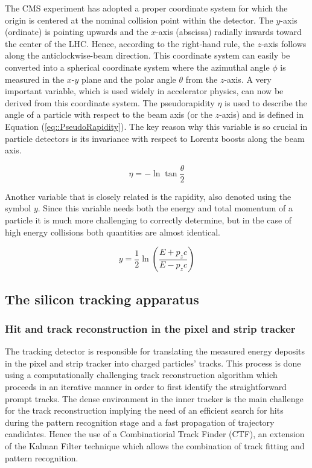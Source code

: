 The CMS experiment has adopted a proper coordinate system for which the origin is centered at the nominal collision point within the detector. The $y$-axis (ordinate) is pointing upwards and the $x$-axis (abscissa) radially inwards toward the center of the LHC. Hence, according to the right-hand rule, the $z$-axis follows along the anticlockwise-beam direction. This coordinate system can easily be converted into a spherical coordinate system where the azimuthal angle $\phi$ is measured in the $x$-$y$ plane and the polar angle $\theta$ from the $z$-axis. 
A very important variable, which is used widely in accelerator physics, can now be derived from this coordinate system. The pseudorapidity $\eta$ is used to describe the angle of a particle with respect to the beam axis (or the $z$-axis) and is defined in Equation (\ref{eq::PseudoRapidity}). The key reason why this variable is so crucial in particle detectors is its invariance with respect to Lorentz boosts along the beam axis.

\begin{equation} \label{eq::PseudoRapidity}
 \eta = - \ln \tan \frac{\theta}{2}
\end{equation}

Another variable that is closely related is the rapidity, also denoted using the symbol $y$. Since this variable needs both the energy and total momentum of a particle it is much more challenging to correctly determine, but in the case of high energy collisions both quantities are almost identical.

\begin{equation}
 y = \frac{1}{2} \ln \left( \frac{E+p_{z}c}{E - p_{z}c} \right)
\end{equation}

\subsection{The silicon tracking apparatus}

\subsubsection*{Hit and track reconstruction in the pixel and strip tracker}

The tracking detector is responsible for translating the measured energy deposits in the pixel and strip tracker into charged particles' tracks. This process is done using a computationally challenging track reconstruction algorithm which proceeds in an iterative manner in order to first identify the straightforward prompt tracks.
The dense environment in the inner tracker is the main challenge for the track reconstruction implying the need of an efficient search for hits during the pattern recognition stage and a fast propagation of trajectory candidates. Hence the use of a Combinatiorial Track Finder (CTF), an extension of the Kalman Filter technique which allows the combination of track fitting and pattern recognition.

